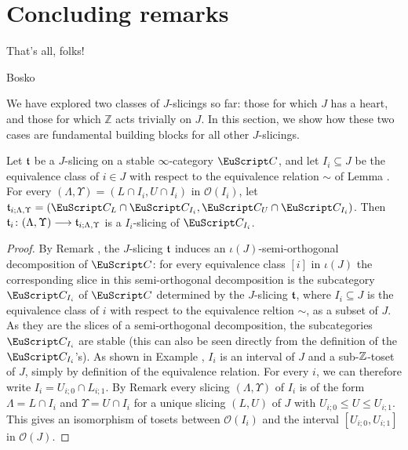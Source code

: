 \section{Concluding remarks}
\label{concluding}
\begin{modifyepigraph}{.2}
\epigraph{That's all, folks!}{Bosko}
\end{modifyepigraph}

We have explored two classes of $J$-slicings so far: those for which $J$ has a heart, and those for which $\mathbb{Z}$ acts trivially on $J$. In this section, we show how these two cases are fundamental building blocks for all other $J$-slicings. 





{\color{green!40!black}
\begin{lemma}\label{for-the-main-theorem}
Let $\mathfrak{t}$ be a $J$-slicing on a stable $\infty$-category $\C$, and let $I_i\subseteq J$ be the equivalence class of $i\in J$ with respect to the equivalence relation $\sim$ of Lemma . For every $(\Lambda,\Upsilon)=(L\cap I_{i},U\cap I_{i})$ in $\mathcal{O}(I_i)$, let $\tee_{i;\Lambda,\Upsilon}=(\C_L\cap \C_{I_i},\C_U\cap \C_{I_i})$. Then $\mathfrak{t}_i\colon (\Lambda,\Upsilon)\longrightarrow \mathfrak{t}_{i;\Lambda,\Upsilon}$ is a $I_i$-slicing of $\C_{I_i}$.
\end{lemma}
\begin{proof}
By Remark , the $J$-slicing $\mathfrak{t}$ induces an $\iota(J)$-semi-orthogonal decomposition of $\C$: for every equivalence class $[i]$ in $\iota(J)$ the corresponding slice in this semi-orthogonal decomposition is the subcategory $\C_{I_i}$ of $\C$ determined by the $J$-slicing $\mathfrak{t}$, where $I_i\subseteq J$ is the equivalence class of $i$ with respect to the equivalence reltion $\sim$, as a subset of $J$. As they are the slices of a semi-orthogonal decomposition, the subcategories $\C_{I_i}$ are stable (this can also be seen directly from the definition of the $\C_{I_i}$'s).
 As shown in Example , $I_i$ is an interval of $J$ and a sub-$\mathbb{Z}$-toset of $J$, simply by definition of the equivalence relation. 
For every $i$, we can therefore write $I_i=U_{i;0}\cap L_{i;1}$. By Remark  every slicing $(\Lambda,\Upsilon)$ of $I_i$ is of the form $\Lambda=L\cap I_{i}$ and $\Upsilon=U\cap I_{i}$ for a unique slicing $(L,U)$ of $J$ with $U_{i;0}\leq U\leq U_{i;1}$. This gives an isomorphism of tosets between $\mathcal{O}(I_i)$ and the interval $[U_{i;0},U_{i;1}]$ in $\mathcal{O}(J)$.

\end{proof}}
